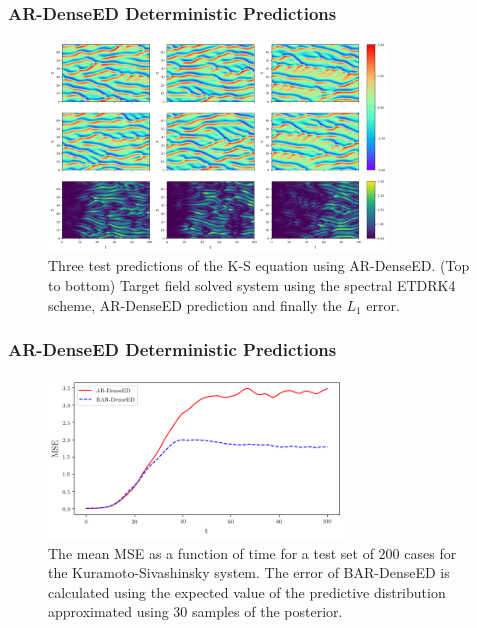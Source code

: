 \documentclass{beamer}
\theoremstyle{remark}
\begin{document}
\begin{frame}
\frametitle{AR-DenseED Deterministic Predictions}
\begin{figure}[H]
    \centering
    \includegraphics[width=0.8\textwidth]{Fig05.png}
    \caption{Three test predictions of the K-S equation using AR-DenseED. (Top to bottom) Target field solved system using the spectral ETDRK4 scheme, AR-DenseED prediction and finally the $L_1$ error.}
    \label{fig:ks-test-prediction}
\end{figure}
\end{frame}

\begin{frame}
\frametitle{AR-DenseED Deterministic Predictions}
\begin{figure}[H]
    \centering
    \includegraphics[width=0.7\textwidth]{Fig06.png}
    \caption{The mean MSE as a function of time for a test set of $200$ cases for the Kuramoto-Sivashinsky system.
    The error of BAR-DenseED is calculated using the expected value of the predictive distribution approximated using 30 samples of the posterior.}
    \label{fig:ks-mse}
\end{figure}
\end{frame}
\end{document}
